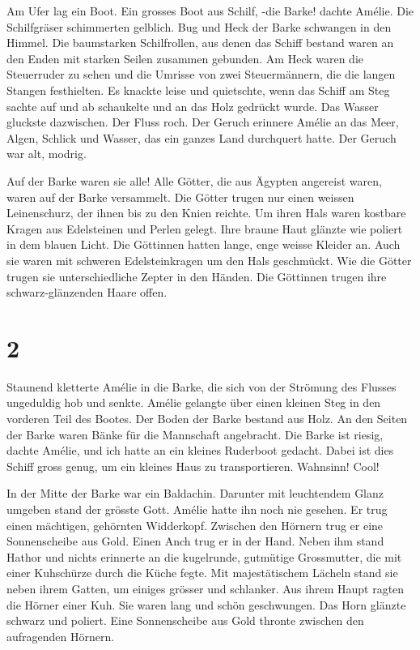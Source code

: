 \documentclass[11pt,titlepage,a5paper]{book}
\begin{document}
Am Ufer lag ein Boot. Ein grosses Boot aus Schilf, -die Barke! dachte Amélie. Die Schilfgräser schimmerten gelblich. Bug und Heck der Barke schwangen in den Himmel. Die baumstarken Schilfrollen, aus denen das Schiff bestand waren an den Enden mit starken Seilen zusammen gebunden. Am Heck waren die Steuerruder zu sehen und die Umrisse von zwei Steuermännern, die die langen Stangen festhielten. Es knackte leise und quietschte, wenn das Schiff am Steg sachte auf und ab schaukelte und an das Holz gedrückt wurde. Das Wasser gluckste dazwischen. Der Fluss roch. Der Geruch erinnere Amélie an das Meer, Algen, Schlick und Wasser, das ein ganzes Land durchquert hatte. Der Geruch war alt, modrig.

Auf der Barke waren sie alle! Alle Götter, die aus Ägypten angereist waren, waren auf der Barke versammelt. Die Götter trugen nur einen weissen Leinenschurz, der ihnen bis zu den Knien reichte. Um ihren Hals waren kostbare Kragen aus Edelsteinen und Perlen gelegt. Ihre braune Haut glänzte wie poliert in dem blauen Licht. Die Göttinnen hatten lange, enge weisse Kleider an. Auch sie waren mit schweren Edelsteinkragen um den Hals geschmückt. Wie die Götter trugen sie unterschiedliche Zepter in den Händen. Die Göttinnen trugen ihre schwarz-glänzenden Haare offen. 

\section*{2}

Staunend kletterte Amélie in die Barke, die sich von der Strömung des Flusses ungeduldig hob und senkte. Amélie gelangte über einen kleinen Steg in den  vorderen Teil des Bootes. Der Boden der Barke bestand aus Holz. An den Seiten der Barke waren Bänke für die Mannschaft angebracht. Die Barke ist riesig, dachte Amélie, und ich hatte an ein kleines Ruderboot gedacht. Dabei ist dies Schiff gross genug, um ein kleines Haus zu transportieren. Wahnsinn! Cool!

In der Mitte der Barke war ein Baldachin. Darunter mit leuchtendem Glanz umgeben stand der grösste Gott. Amélie hatte ihn noch nie gesehen. Er trug einen mächtigen, gehörnten Widderkopf. Zwischen den Hörnern trug er eine Sonnenscheibe aus Gold. Einen Anch trug er in der Hand. Neben ihm stand Hathor und nichts erinnerte an die kugelrunde, gutmütige Grossmutter, die mit einer Kuhschürze durch die Küche fegte. Mit majestätischem Lächeln stand sie neben ihrem Gatten, um einiges grösser und schlanker. Aus ihrem Haupt ragten die Hörner einer Kuh. Sie waren lang und schön geschwungen. Das Horn glänzte schwarz und poliert. Eine Sonnenscheibe aus Gold thronte zwischen den aufragenden Hörnern. 
\end{document}
